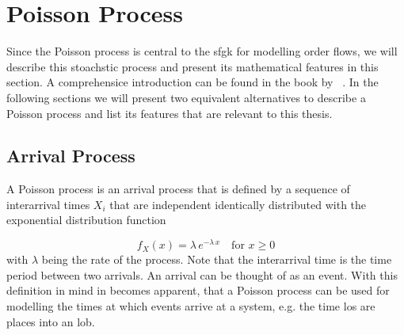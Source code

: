 \documentclass[11pt, a4paper]{thesis}  %
\begin{document}
%
%

\chapter{Poisson Process}
\label{chapter:poisson_process}

Since the Poisson process is central to the \ac{sfgk} for modelling order flows, we will describe this stoachstic process and present its mathematical features in this section. A comprehensice introduction can be found in the book by \citeauthor{Gallager:2013:stochastic_processes}~\cite{Gallager:2013:stochastic_processes}.
%
In the following sections we will present two equivalent alternatives to describe a Poisson process and list its features that are relevant to this thesis.


\section{Arrival Process}
\label{section:poisson:arrival_process}

A Poisson process is an arrival process that is defined by a sequence of interarrival times $X_i$ that are independent identically distributed with the exponential distribution function 

\begin{equation}
	f_X(x)=\lambda\,e^{-\lambda\,x}\quad\textrm{for } x\ge 0
	\label{equation:interarrival_time_poisson}
\end{equation}
%
with $\lambda$ being the rate of the process. Note that the interarrival time is the time period between two arrivals. An arrival can be thought of as an event. With this definition in mind in becomes apparent, that a Poisson process can be used for modelling the times at which events arrive at a system, e.g. the time \acp{lo} are places into an \ac{lob}.

\end{document}
